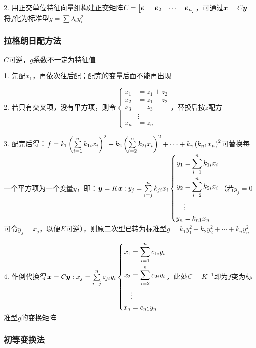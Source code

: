 \documentclass{article}
\begin{document}
2. 用正交单位特征向量组构建正交矩阵$C=\begin{bmatrix}\boldsymbol e_1&\boldsymbol e_2&\cdots&\boldsymbol e_n\end{bmatrix}$，可通过$\boldsymbol x=C\boldsymbol y$将$f$化为标准型$g=\sum\lambda_iy_i^2$

\subsubsection{拉格朗日配方法}

$C$可逆，$g$系数不一定为特征值

1. 先配$x_1$，再依次往后配；配完的变量后面不能再出现

2. 若只有交叉项，没有平方项，则令$\left\{\begin{aligned}
        x_1 & =z_1+z_2 \\
        x_2 & =z_1-z_2 \\
        x_3 & =z_3     \\
            & \vdots   \\
        x_n & =z_n
    \end{aligned}\right.$，替换后按$z$配方

3. 配完后得：$f=k_1\left(\sum\limits_{i=1}^nk_{1i}x_i\right)^2+
    k_2\left(\sum\limits_{i=2}^nk_{2i}x_i\right)^2+\cdots+
    k_n\left(k_{n1}x_n\right)^2$可替换每一个平方项为一个变量$y$，即：$\boldsymbol y=K\boldsymbol x:y_j=\sum\limits_{i=j}^nk_{ji}x_i\left\{\begin{aligned}
        y_1 & =\sum_{i=1}^nk_{1i}x_i \\
        y_2 & =\sum_{i=2}^nk_{2i}x_i \\
            & \vdots                 \\
        y_n & =k_{n1}x_n
    \end{aligned}\right.$（若$y_j=0$可令$y_j=x_j$，以便$K$可逆），则原二次型已转为标准型$g=k_1y_1^2+k_2y_2^2+\cdots+k_ny_n^2$

4. 作倒代换得$\boldsymbol x=C\boldsymbol y:x_j=\sum\limits_{i=j}^nc_{ji}y_i\left\{\begin{aligned}
        x_1 & =\sum_{i=1}^nc_{1i}y_i \\
        x_2 & =\sum_{i=2}^nc_{2i}y_i \\
            & \vdots                 \\
        x_n & =c_{n1}y_n
    \end{aligned}\right.$，此处$C=K^{-1}$即为$f$变为标准型$g$的变换矩阵

\subsubsection{初等变换法}
\end{document}
